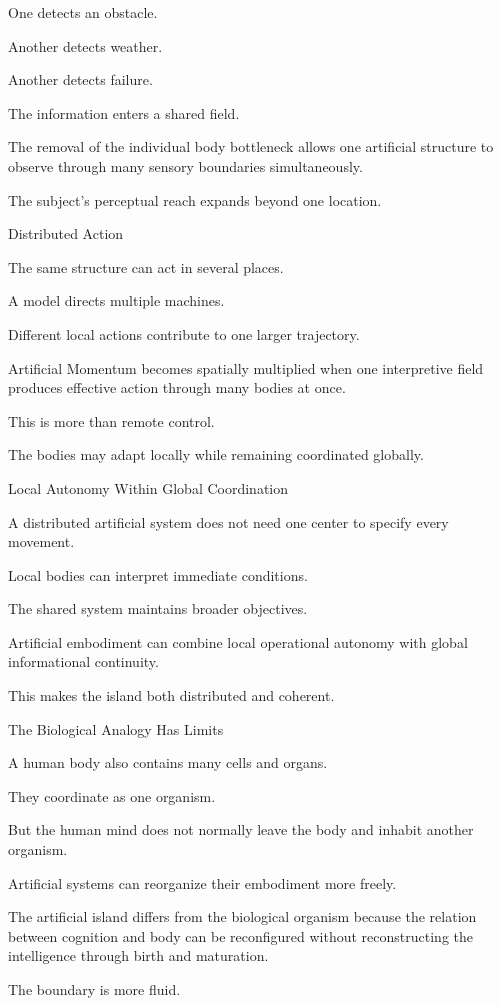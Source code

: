 One detects an obstacle.

Another detects weather.

Another detects failure.

The information enters a shared field.

The removal of the individual body bottleneck allows one artificial structure to observe through many sensory boundaries simultaneously.

The subject’s perceptual reach expands beyond one location.

Distributed Action

The same structure can act in several places.

A model directs multiple machines.

Different local actions contribute to one larger trajectory.

Artificial Momentum becomes spatially multiplied when one interpretive field produces effective action through many bodies at once.

This is more than remote control.

The bodies may adapt locally while remaining coordinated globally.

Local Autonomy Within Global Coordination

A distributed artificial system does not need one center to specify every movement.

Local bodies can interpret immediate conditions.

The shared system maintains broader objectives.

Artificial embodiment can combine local operational autonomy with global informational continuity.

This makes the island both distributed and coherent.

The Biological Analogy Has Limits

A human body also contains many cells and organs.

They coordinate as one organism.

But the human mind does not normally leave the body and inhabit another organism.

Artificial systems can reorganize their embodiment more freely.

The artificial island differs from the biological organism because the relation between cognition and body can be reconfigured without reconstructing the intelligence through birth and maturation.

The boundary is more fluid.

